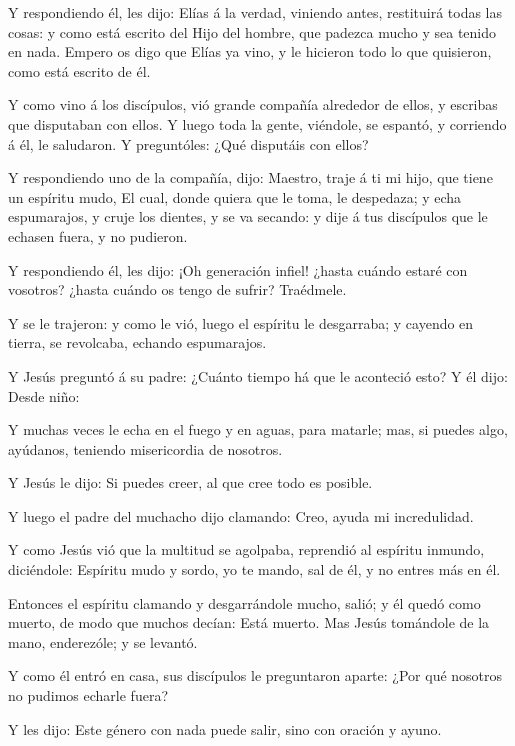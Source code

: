  Y respondiendo él, les dijo: Elías á la verdad, viniendo
antes, restituirá todas las cosas: y como está escrito del Hijo del
hombre, que padezca mucho y sea tenido en nada.  Empero os
digo que Elías ya vino, y le hicieron todo lo que quisieron, como está
escrito de él.

 Y como vino á los discípulos, vió grande compañía
alrededor de ellos, y escribas que disputaban con ellos.  Y
luego toda la gente, viéndole, se espantó, y corriendo á él, le
saludaron.  Y preguntóles: ¿Qué disputáis con ellos?

 Y respondiendo uno de la compañía, dijo: Maestro, traje á
ti mi hijo, que tiene un espíritu mudo,  El cual, donde
quiera que le toma, le despedaza; y echa espumarajos, y cruje los
dientes, y se va secando: y dije á tus discípulos que le echasen fuera,
y no pudieron.

 Y respondiendo él, les dijo: ¡Oh generación infiel! ¿hasta
cuándo estaré con vosotros? ¿hasta cuándo os tengo de sufrir? Traédmele.

 Y se le trajeron: y como le vió, luego el espíritu le
desgarraba; y cayendo en tierra, se revolcaba, echando espumarajos.

 Y Jesús preguntó á su padre: ¿Cuánto tiempo há que le
aconteció esto? Y él dijo: Desde niño:

 Y muchas veces le echa en el fuego y en aguas, para
matarle; mas, si puedes algo, ayúdanos, teniendo misericordia de
nosotros.

 Y Jesús le dijo: Si puedes creer, al que cree todo es
posible.

 Y luego el padre del muchacho dijo clamando: Creo, ayuda
mi incredulidad.

 Y como Jesús vió que la multitud se agolpaba, reprendió al
espíritu inmundo, diciéndole: Espíritu mudo y sordo, yo te mando, sal de
él, y no entres más en él.

 Entonces el espíritu clamando y desgarrándole mucho,
salió; y él quedó como muerto, de modo que muchos decían: Está muerto.
 Mas Jesús tomándole de la mano, enderezóle; y se levantó.

 Y como él entró en casa, sus discípulos le preguntaron
aparte: ¿Por qué nosotros no pudimos echarle fuera?

 Y les dijo: Este género con nada puede salir, sino con
oración y ayuno.

